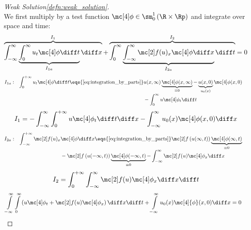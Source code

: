 \begin{proofbox}\nospacing
    \begin{proof}[Weak Solution\cref{defn:weak_solution}]\label{proof:defn:weak_solution}\leavevmode\\
        We first multiply \label{eq:conservation_law1D} by a test function $\testfunc\in\sm_{0}^{1}\left(\R\times\Rp\right)$
        and integrate over space and time:
        \begin{align*}
          \overbrace{\int_{-\infty}^{\infty}\underbrace{\int_{0}^{\infty}u_{t}\testfunc\diff t}_{I_{1a}}\diff x}^{I_{1}}+
          \overbrace{\int_{0}^{\infty}\underbrace{\int_{-\infty}^{\infty}\flux(u)_{x}\testfunc\diff x}_{I_{2a}}\diff t}^{I_{2}}=0
        \end{align*}
        \begin{align*}
            I_{1a}:&&\int_{0}^{+\infty}u_{t}\testfunc\diff t\eqs{\text{\cref{eq:integration_by_parts}}}&u(x,\infty)\underbrace{\testfunc(x,\infty)}_{\equiv0}-
            \underbrace{u(x,0)}_{u_{0}(x)}\testfunc(x,0)&&\\[-1\jot]
            &&&-\int_{0}^{\infty}u\testfunc_{t}\diff t&&
        \end{align*}
        \begin{align*}
          I_{1}=-\int_{-\infty}^{\infty}\int_{0}^{+\infty}u\testfunc_{t}\diff t\diff x
          -\int_{-\infty}^{\infty} u_{0}(x)\testfunc(x,0)\diff x
        \end{align*}
        \begin{align*}
          I_{2a}:&&\int_{-\infty}^{+\infty}\flux(u)_{x}&\testfunc\diff x\eqs{\text{\cref{eq:integration_by_parts}}}\flux\left(u(\infty,t)\right)
                                                                         \underbrace{\testfunc(\infty,t)}_{\equiv0}&&\\[-1\jot]
                 &&&-\flux\left(u(-\infty,t)\right)\underbrace{\testfunc(-\infty,t)}_{\equiv0}-\int_{-\infty}^{\infty}\flux(u)\testfunc_{x}\diff x&&
        \end{align*}
        \begin{align*}
            I_{2}=\int_{0}^{+\infty}\int_{-\infty}^{\infty}\flux(u)\testfunc_{x}\diff x\diff t
        \end{align*}
        \begin{align*}
            &\int\limits_{-\infty}^\infty\int\limits_0^{\infty}
            \left(u\testfunc_{t}+\flux(u)\testfunc_{x}\right)
            \diff x \diff t+\int\limits_{-\infty}^\infty u_0(x)\mc[4]{\phi}(x,0)\diff x=0
        \end{align*}
    \end{proof}
\end{proofbox}

